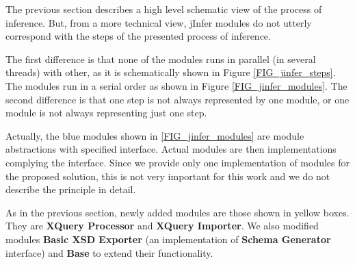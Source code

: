 The previous section describes a high level schematic view of the process of inference. But, from a more technical view, jInfer modules do not utterly correspond with the steps of the presented process of inference.

The first difference is that none of the modules runs in parallel (in several threads) with other, as it is schematically shown in Figure \ref{FIG_jinfer_steps}. The modules run in a serial order as shown in Figure \ref{FIG_jinfer_modules}. The second difference is that one step is not always represented by one module, or one module is not always representing just one step.

Actually, the blue modules shown in \ref{FIG_jinfer_modules} are module abstractions with specified interface. Actual modules are then implementations complying the interface. Since we provide only one implementation of modules for the proposed solution, this is not very important for this work and we do not describe the principle in detail.

As in the previous section, newly added modules are those shown in yellow boxes. They are \textbf{XQuery Processor} and \textbf{XQuery Importer}. We also modified modules \textbf{Basic XSD Exporter} (an implementation of \textbf{Schema Generator} interface) and \textbf{Base} to extend their functionality.

